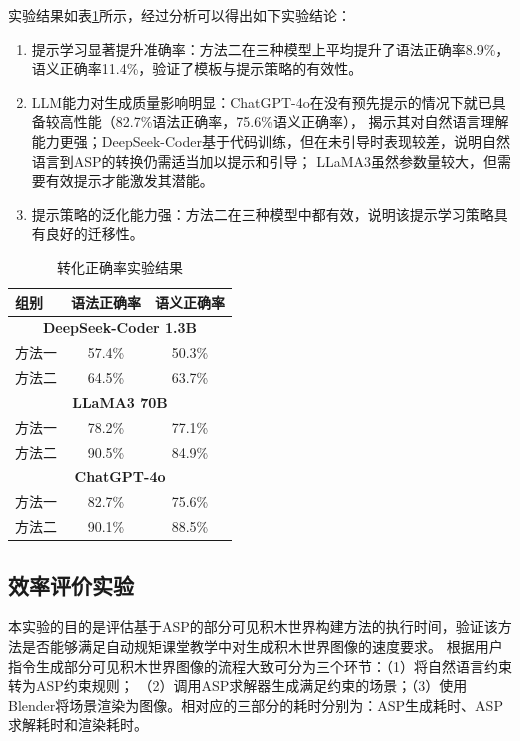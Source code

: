 实验结果如表\ref{tab:asp-based-constraint-construction}所示，经过分析可以得出如下实验结论：
\begin{enumerate}[nosep]
\item 提示学习显著提升准确率：方法二在三种模型上平均提升了语法正确率8.9\%，语义正确率11.4\%，验证了模板与提示策略的有效性。
\item LLM能力对生成质量影响明显：ChatGPT-4o在没有预先提示的情况下就已具备较高性能（82.7\%语法正确率，75.6\%语义正确率），
揭示其对自然语言理解能力更强；DeepSeek-Coder基于代码训练，但在未引导时表现较差，说明自然语言到ASP的转换仍需适当加以提示和引导；
LLaMA3虽然参数量较大，但需要有效提示才能激发其潜能。
\item 提示策略的泛化能力强：方法二在三种模型中都有效，说明该提示学习策略具有良好的迁移性。
\end{enumerate}
\begin{table}[h]
    \centering
    \begin{tabular}{lcc}
        \toprule
        \textbf{组别} & \textbf{语法正确率} & \textbf{语义正确率} \\
        \midrule
        \multicolumn{3}{c}{\textbf{DeepSeek-Coder 1.3B}} \\
        方法一 & 57.4\% & 50.3\% \\
        方法二 & 64.5\% & 63.7\% \\
        \midrule
        \multicolumn{3}{c}{\textbf{LLaMA3 70B}} \\
        方法一 & 78.2\% & 77.1\% \\
        方法二 & 90.5\% & 84.9\% \\
        \midrule
        \multicolumn{3}{c}{\textbf{ChatGPT-4o}} \\
        方法一 & 82.7\% & 75.6\% \\
        方法二 & 90.1\% & 88.5\% \\
        \bottomrule
    \end{tabular}
    \caption{转化正确率实验结果}
    \label{tab:asp-based-constraint-construction}
\end{table}
\subsection{效率评价实验}
本实验的目的是评估基于ASP的部分可见积木世界构建方法的执行时间，验证该方法是否能够满足自动规矩课堂教学中对生成积木世界图像的速度要求。
根据用户指令生成部分可见积木世界图像的流程大致可分为三个环节：（1）将自然语言约束转为ASP约束规则；
（2）调用ASP求解器生成满足约束的场景；（3）使用Blender将场景渲染为图像。相对应的三部分的耗时分别为：ASP生成耗时、ASP求解耗时和渲染耗时。

